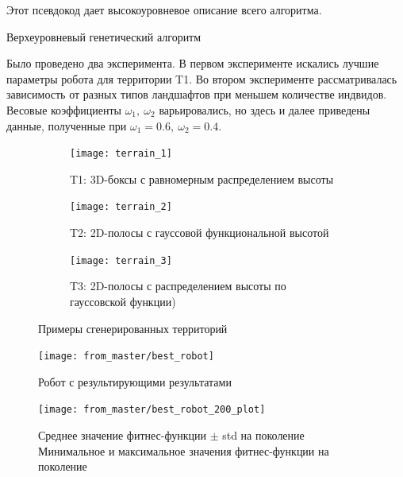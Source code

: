 Этот псевдокод дает высокоуровневое описание всего алгоритма.

\begin{algorithm}[H]
\caption{Верхеуровневый генетический алгоритм\label{high_level}}
\end{algorithm}

Было проведено два эксперимента. В первом эксперименте искались лучшие параметры робота для территории T1. Во втором эксперименте рассматривалась зависимость от разных типов ландшафтов при меньшем количестве индвидов. Весовые коэффициенты $\omega_1,\ \omega_2$ варьировались, но здесь и далее приведены данные, полученные при $\omega_1 = 0.6,\ \omega_2 = 0.4$. 

\begin{figure}[H]
    \begin{subfigure}{0.33\textwidth}
    \centering\texttt{[image: terrain\_1]} 
    \caption{T1: 3D-боксы с равномерным распределением высоты}
    \label{fig:terrain_1}
    \end{subfigure}
    \begin{subfigure}{0.33\textwidth}
    \centering\texttt{[image: terrain\_2]} 
    \caption{T2: 2D-полосы с гауссовой функциональной высотой}
    \label{fig:terrain_2}
    \end{subfigure}
    \begin{subfigure}{0.33\textwidth}
    \centering\texttt{[image: terrain\_3]}
    \caption{T3: 2D-полосы с распределением высоты по гауссовской функции)}
    \label{fig:terrain_3}
    \end{subfigure}
     
    \caption{Примеры сгенерированных территорий}
    \label{fig:terrains}
\end{figure}

\begin{figure}[H]
    \centering\texttt{[image: from\_master/best\_robot]}\\
    \caption{Робот с результирующими результатами}
    \label{fig:best_robot}
    \end{figure}
    \begin{figure}[H]
    \centering\texttt{[image: from\_master/best\_robot\_200\_plot]}\\
    \caption{Среднее значение фитнес-функции $\pm$ std на поколение
    Минимальное и максимальное значения фитнес-функции на поколение}
    \label{fig:plot4}
    \end{figure}
    
